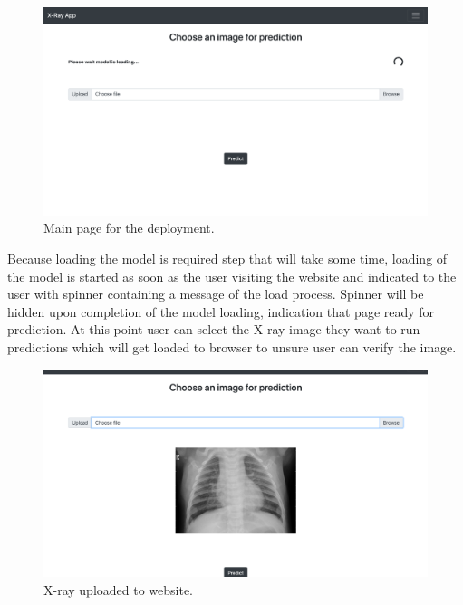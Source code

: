 \begin{figure}[H]
    \centering
    \includegraphics[width=\textwidth]{img/webhome.png}
    \caption{Main page for the deployment.}
    \label{fig:webhome}
\end{figure}

Because loading the model is required step that will take some time, loading of the model is started as soon as the user visiting the website and indicated to the user with spinner containing a message of the load process.
Spinner will be hidden upon completion of the model loading, indication that page ready for prediction.
At this point user can select the X-ray image they want to run predictions which will get loaded to browser to unsure user can verify the image.

\begin{figure}[H]
    \centering
    \includegraphics[width=\textwidth]{img/imageloaded.png}
    \caption{X-ray uploaded to website.}
    \label{fig:appimgload}
\end{figure}

